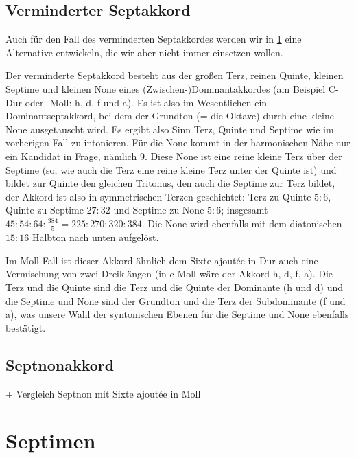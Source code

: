 \subsection{Verminderter Septakkord}

Auch für den Fall des verminderten Septakkordes werden wir in \cref{sec:sept}
eine Alternative entwickeln, die wir aber nicht immer einsetzen wollen.

Der verminderte Septakkord besteht aus der großen Terz, reinen Quinte, kleinen
Septime und kleinen None eines (Zwischen-)Dominantakkordes (am Beispiel C-Dur
oder -Moll: h, d, f und \flat a). Es ist also im Wesentlichen ein
Dominantseptakkord, bei dem der Grundton (= die Oktave) durch eine kleine
None ausgetauscht wird. Es ergibt also Sinn Terz, Quinte und Septime wie im
vorherigen Fall zu intonieren. Für die None kommt in der harmonischen Nähe nur
ein Kandidat in Frage, nämlich \flatp $9$. Diese None ist eine reine kleine Terz
über der Septime (so, wie auch die Terz eine reine kleine Terz unter der Quinte
ist) und bildet zur Quinte den gleichen Tritonus, den auch die Septime zur Terz
bildet, der Akkord ist also in symmetrischen Terzen geschichtet: Terz zu Quinte
$5:6$, Quinte zu Septime $27:32$ und Septime zu None $5:6$; insgesamt
$45:54:64:\frac{384}5 = 225:270:320:384$. Die None wird ebenfalls mit dem
diatonischen $15:16$ Halbton nach unten aufgelöst.

Im Moll-Fall ist dieser Akkord ähnlich dem Sixte ajoutée in Dur auch eine
Vermischung von zwei Dreiklängen (in c-Moll wäre der Akkord \naturalm h, d, f,
\flatp a). Die Terz und die Quinte sind die Terz und die Quinte der Dominante
(\naturalm h und d) und die Septime und None sind der Grundton und die Terz der
Subdominante (f und \flatp a), was unsere Wahl der syntonischen Ebenen für die
Septime und None ebenfalls bestätigt.

\subsection{Septnonakkord}

+ Vergleich Septnon mit Sixte ajoutée in Moll

\section{Septimen}
\label{sec:sept}

